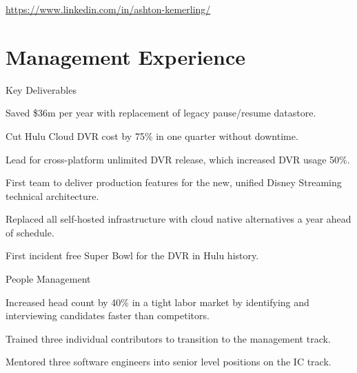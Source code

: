 \documentclass[]{deedy-resume-openfont}
\begin{document}
%
%
\lastupdated

%
%



\href{https://www.linkedin.com/in/ashton-kemerling/}{https://www.linkedin.com/in/ashton-kemerling/}

\begin{center}
\end{center}

\section{Management Experience}

\vspace{\topsep}
Key Deliverables
\begin{tightemize}
\item Saved \$36m per year with replacement of legacy pause/resume datastore.
\item Cut Hulu Cloud DVR cost by 75\% in one quarter without downtime.
\item Lead for cross-platform unlimited DVR release, which increased DVR usage 50\%.
\item First team to deliver production features for the new, unified Disney Streaming technical architecture.
\item Replaced all self-hosted infrastructure with cloud native alternatives a year ahead of schedule.
\item First incident free Super Bowl for the DVR in Hulu history.
\end{tightemize}

\sectionsep
People Management
\begin{tightemize}
\item Increased head count by 40\% in a tight labor market by identifying and interviewing candidates faster than competitors.
\item Trained three individual contributors to transition to the management track.
\item Mentored three software engineers into senior level positions on the IC track.
\end{tightemize}
\sectionsep
\end{document}
